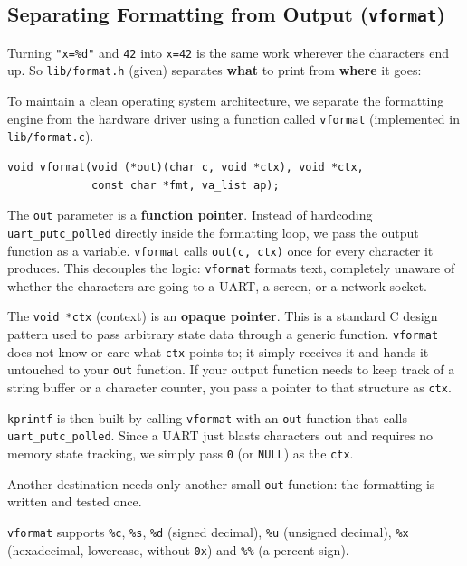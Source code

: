 \subsection{Separating Formatting from Output (\texttt{vformat})}
Turning \texttt{"x=\%d"} and \texttt{42} into \texttt{x=42} is the same work wherever the characters end up. So \texttt{lib/format.h} (given) separates \textbf{what} to print from \textbf{where} it goes:

To maintain a clean operating system architecture, we separate the formatting engine from the hardware driver using a function called \texttt{vformat} (implemented in \texttt{lib/format.c}). 

\begin{lstlisting}
void vformat(void (*out)(char c, void *ctx), void *ctx,
             const char *fmt, va_list ap);
\end{lstlisting}

The \texttt{out} parameter is a \textbf{function pointer}. Instead of hardcoding \texttt{uart\_putc\_polled} directly inside the formatting loop, we pass the output function as a variable. \texttt{vformat} calls \texttt{out(c, ctx)} once for every character it produces. This decouples the logic: \texttt{vformat} formats text, completely unaware of whether the characters are going to a UART, a screen, or a network socket.

The \texttt{void *ctx} (context) is an \textbf{opaque pointer}. This is a standard C design pattern used to pass arbitrary state data through a generic function. \texttt{vformat} does not know or care what \texttt{ctx} points to; it simply receives it and hands it untouched to your \texttt{out} function. If your output function needs to keep track of a string buffer or a character counter, you pass a pointer to that structure as \texttt{ctx}. 

\texttt{kprintf} is then built by calling \texttt{vformat} with an \texttt{out} function that calls \texttt{uart\_putc\_polled}. Since a UART just blasts characters out and requires no memory state tracking, we simply pass \texttt{0} (or \texttt{NULL}) as the \texttt{ctx}. 

Another destination needs only another small \texttt{out} function: the formatting is written and tested once.

\texttt{vformat} supports \texttt{\%c}, \texttt{\%s}, \texttt{\%d} (signed decimal), \texttt{\%u} (unsigned decimal), \texttt{\%x} (hexadecimal, lowercase, without \texttt{0x}) and \texttt{\%\%} (a percent sign). 

